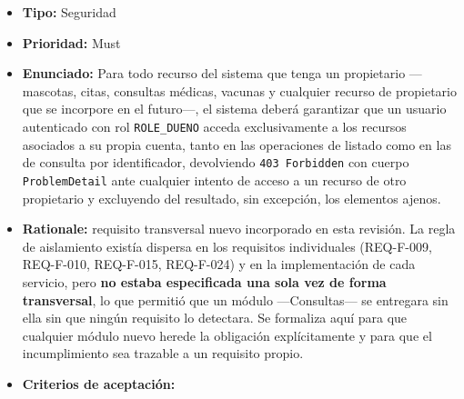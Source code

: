 \documentclass[
  spanish,
]{article}
\begin{document}
\begin{itemize}
\item
  \textbf{Tipo:} Seguridad
\item
  \textbf{Prioridad:} Must
\item
  \textbf{Enunciado:} Para todo recurso del sistema que tenga un
  propietario ---mascotas, citas, consultas médicas, vacunas y cualquier
  recurso de propietario que se incorpore en el futuro---, el sistema
  deberá garantizar que un usuario autenticado con rol
  \texttt{ROLE\_\allowbreak{}DUENO} acceda exclusivamente a los recursos asociados a
  su propia cuenta, tanto en las operaciones de listado como en las de
  consulta por identificador, devolviendo \texttt{403\ Forbidden} con
  cuerpo \texttt{Problem\allowbreak{}Detail} ante cualquier intento de acceso a un
  recurso de otro propietario y excluyendo del resultado, sin excepción,
  los elementos ajenos.
\item
  \textbf{Rationale:} requisito transversal nuevo incorporado en esta
  revisión. La regla de aislamiento existía dispersa en los requisitos
  individuales (REQ-F-009, REQ-F-010, REQ-F-015, REQ-F-024) y en la
  implementación de cada servicio, pero \textbf{no estaba especificada
  una sola vez de forma transversal}, lo que permitió que un módulo
  ---Consultas--- se entregara sin ella sin que ningún requisito lo
  detectara. Se formaliza aquí para que cualquier módulo nuevo herede la
  obligación explícitamente y para que el incumplimiento sea trazable a
  un requisito propio.
\item
  \textbf{Criterios de aceptación:}


\end{itemize}
\end{document}
